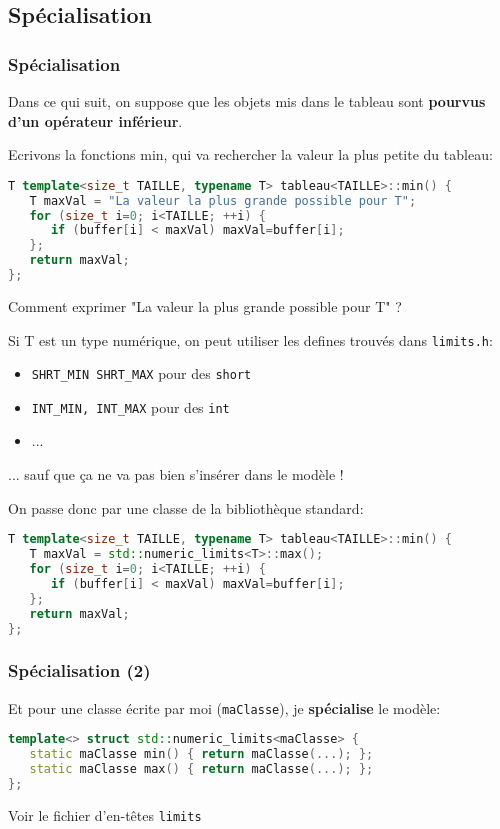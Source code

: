 \documentclass{beamer}
\begin{document}
\subsection{Spécialisation}

\begin{frame}[fragile=singleslide,shrink=20]
\frametitle {Spécialisation}

Dans ce qui suit, on  suppose que les objets mis dans le tableau sont \textbf{pourvus d'un opérateur inférieur}.

Ecrivons la fonctions min, qui va rechercher la valeur la plus petite du tableau:

\begin{lstlisting}[language=c++]
T template<size_t TAILLE, typename T> tableau<TAILLE>::min() {
   T maxVal = "La valeur la plus grande possible pour T";
   for (size_t i=0; i<TAILLE; ++i) {
      if (buffer[i] < maxVal) maxVal=buffer[i];
   };
   return maxVal;
};
\end{lstlisting}

Comment exprimer "La valeur la plus grande possible pour T" ?

Si T est un type numérique, on peut utiliser les defines trouvés dans \texttt{limits.h}:

\begin{itemize}
\item{ \texttt{SHRT\_MIN SHRT\_MAX} pour des \texttt{short}}
\item{ \texttt{INT\_MIN, INT\_MAX} pour des \texttt{int}}
\item{...}
\end{itemize}
... sauf que ça ne va pas bien s'insérer dans le modèle !

On passe donc par une classe de la bibliothèque standard:
\begin{lstlisting}[language=c++]
T template<size_t TAILLE, typename T> tableau<TAILLE>::min() {
   T maxVal = std::numeric_limits<T>::max();
   for (size_t i=0; i<TAILLE; ++i) {
      if (buffer[i] < maxVal) maxVal=buffer[i];
   };
   return maxVal;
};
\end{lstlisting}
\end{frame}

\begin{frame}[fragile=singleslide,shrink=20]
\frametitle {Spécialisation (2)}

Et pour une classe écrite par moi (\texttt{maClasse}), je \textbf{spécialise} le modèle:

\begin{lstlisting}[language=c++]
template<> struct std::numeric_limits<maClasse> {
   static maClasse min() { return maClasse(...); };
   static maClasse max() { return maClasse(...); };
};
\end{lstlisting}

Voir le fichier d'en-têtes \texttt{limits}

\end{frame}
\end{document}
